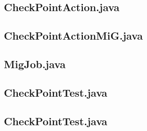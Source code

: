 \begin{landscape}
\subsection{CheckPointAction.java}\label{checkpointaction}

\subsection{CheckPointActionMiG.java}\label{checkpointactionmig}

\subsection{MigJob.java}\label{migjob}

\subsection{CheckPointTest.java}\label{checkpointtest}

\subsection{CheckPointTest.java}\label{jnlp}

\end{landscape}

